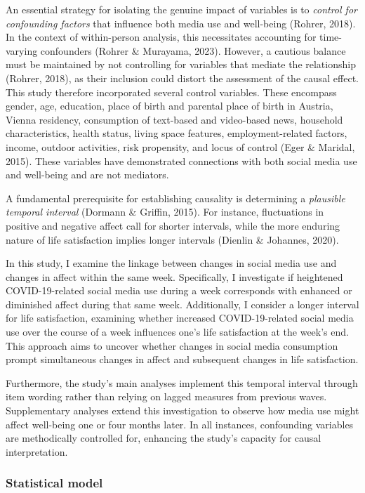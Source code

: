 \documentclass[
  man,mask,floatsintext]{apa7}
\begin{document}
An essential strategy for isolating the genuine impact of variables is to \emph{control for confounding factors} that influence both media use and well-being (Rohrer, 2018). In the context of within-person analysis, this necessitates accounting for time-varying confounders (Rohrer \& Murayama, 2023). However, a cautious balance must be maintained by not controlling for variables that mediate the relationship (Rohrer, 2018), as their inclusion could distort the assessment of the causal effect. This study therefore incorporated several control variables. These encompass gender, age, education, place of birth and parental place of birth in Austria, Vienna residency, consumption of text-based and video-based news, household characteristics, health status, living space features, employment-related factors, income, outdoor activities, risk propensity, and locus of control (Eger \& Maridal, 2015). These variables have demonstrated connections with both social media use and well-being and are not mediators.

A fundamental prerequisite for establishing causality is determining a \emph{plausible temporal interval} (Dormann \& Griffin, 2015). For instance, fluctuations in positive and negative affect call for shorter intervals, while the more enduring nature of life satisfaction implies longer intervals (Dienlin \& Johannes, 2020).

In this study, I examine the linkage between changes in social media use and changes in affect within the same week. Specifically, I investigate if heightened COVID-19-related social media use during a week corresponds with enhanced or diminished affect during that same week. Additionally, I consider a longer interval for life satisfaction, examining whether increased COVID-19-related social media use over the course of a week influences one's life satisfaction at the week's end. This approach aims to uncover whether changes in social media consumption prompt simultaneous changes in affect and subsequent changes in life satisfaction.

Furthermore, the study's main analyses implement this temporal interval through item wording rather than relying on lagged measures from previous waves. Supplementary analyses extend this investigation to observe how media use might affect well-being one or four months later. In all instances, confounding variables are methodically controlled for, enhancing the study's capacity for causal interpretation.

\hypertarget{statistical-model}{%
\subsubsection{Statistical model}\label{statistical-model}}
\end{document}
